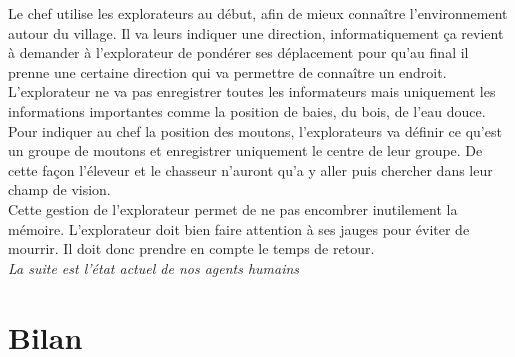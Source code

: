 \documentclass[12pt]{article}
\begin{document}
Le chef utilise les explorateurs au début, afin de mieux connaître 
l'environnement autour du village. Il va leurs indiquer une direction, 
informatiquement ça revient à demander à l'explorateur de pondérer ses 
déplacement pour qu'au final il prenne une certaine direction qui va permettre 
de connaître un endroit.\\

L'explorateur ne va pas enregistrer toutes les informateurs mais uniquement 
les informations importantes comme la position de baies, du bois, de l'eau douce. 
Pour indiquer au chef la position des moutons, l'explorateurs va définir ce 
qu'est un groupe de moutons et enregistrer uniquement le centre de leur 
groupe. De cette façon l'éleveur et le chasseur n'auront qu'a y aller puis 
chercher dans leur champ de vision.\\

Cette gestion de l'explorateur permet de ne pas encombrer inutilement la mémoire. 
L'explorateur doit bien faire attention à ses jauges pour éviter de mourrir. Il 
doit donc prendre en compte le temps de retour.\\

\textit{La suite est l'état actuel de nos agents humains}



\section{Bilan}
\end{document}
